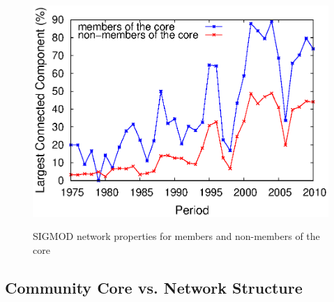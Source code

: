 \begin{figure}[!htpb]
\begin{center}
{    \includegraphics[scale=.31]{graficos/core_over_time/core_community/sigmod_janela_3_core_maior_componente_conectado.eps}
  }
  \end{center}
  \vspace{-0.5cm}
  \caption{SIGMOD network properties for members and non-members of the core}
  \label{fig:metrics_comparing_core_community}
\end{figure}



\subsection{Community Core vs. Network Structure}
\label{sub:corr}

